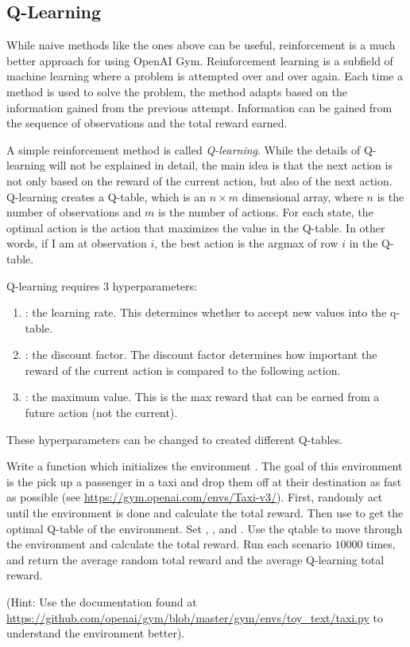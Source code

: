 \subsection*{Q-Learning}
While naive methods like the ones above can be useful, reinforcement is a much better approach for using OpenAI Gym.
Reinforcement learning is a subfield of machine learning where a problem is attempted over and over again. Each time a method is used to solve the problem, the method adapts based on the information gained from the previous attempt.
Information can be gained from the sequence of observations and the total reward earned.

A simple reinforcement method is called \emph{Q-learning}.
While the details of Q-learning will not be explained in detail, the main idea is that the next action is not only based on the reward of the current action, but also of the next action.
Q-learning creates a Q-table, which is an $n\times m$ dimensional array, where $n$ is the number of observations and $m$ is the number of actions.
For each state, the optimal action is the action that maximizes the value in the Q-table.
In other words, if I am at observation $i$, the best action is the argmax of row $i$ in the Q-table.

Q-learning requires 3 hyperparameters:
\begin{enumerate}
\item {}: the learning rate. This determines whether to accept new values into the q-table.
\item {}: the discount factor. The discount factor determines how important the reward of the current action is compared to the following action.
\item {}: the maximum value. This is the max reward that can be earned from a future action (not the current).
\end{enumerate}
These hyperparameters can be changed to created different Q-tables.

\begin{problem}
Write a function  which initializes the environment .
The goal of this environment is the pick up a passenger in a taxi and drop them off at their destination as fast as possible (see \url{https://gym.openai.com/envs/Taxi-v3/}).
First, randomly act until the environment is done and calculate the total reward.
Then use  to get the optimal Q-table of the environment.
Set , , and .
Use the qtable to move through the environment and calculate the total reward.
Run each scenario $10000$ times, and return the average random total reward and the average Q-learning total reward.

(Hint: Use the documentation found at \url{https://github.com/openai/gym/blob/master/gym/envs/toy_text/taxi.py} to understand the environment better).
\label{prob:taxi}
\end{problem}
